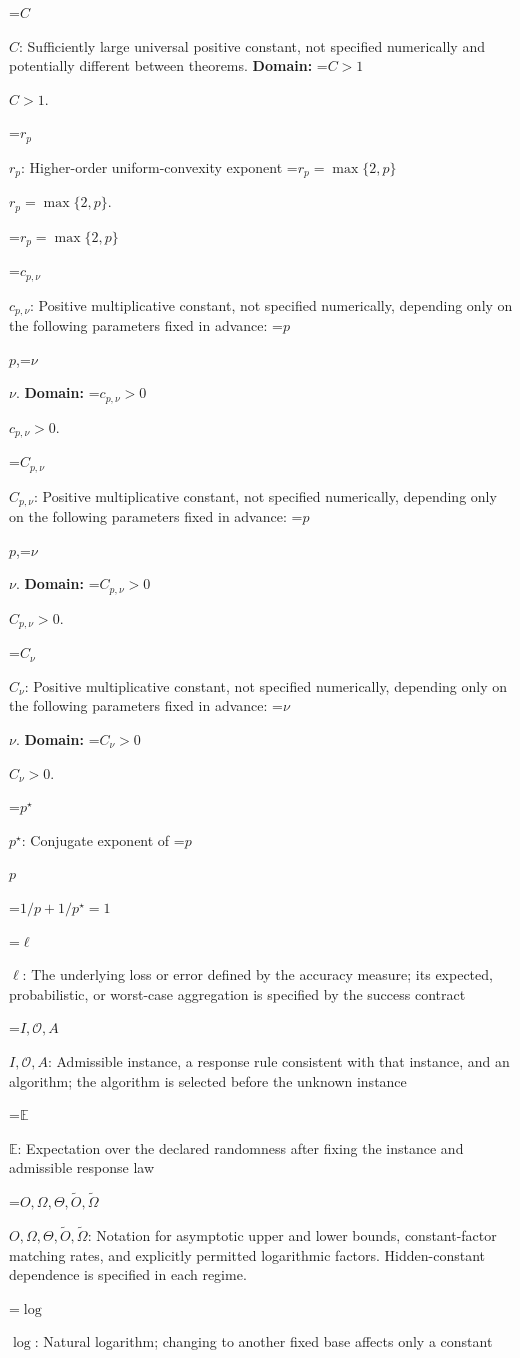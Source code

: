 \documentclass[10pt,a4paper]{article}
\newcommand{\AtlasMath}[1]{\par\begingroup\centering\setbox0=\hbox{$\displaystyle #1$}\ifdim\wd0>1.4\linewidth\typeout{ATLAS WIDE FORMULA: \the\wd0}\fi\ifdim\wd0>\linewidth\resizebox{\linewidth}{!}{\box0}\else\box0\fi\par\endgroup}
\newcommand{\AtlasInlineMath}[1]{\begingroup\setbox0=\hbox{$#1$}\ifdim\wd0>.4\linewidth\endgroup\AtlasMath{#1}\else\endgroup$#1$\fi}
\begin{document}
\AtlasInlineMath{C}: Sufficiently large universal positive constant, not specified numerically and potentially different between theorems. \textbf{Domain:} \AtlasInlineMath{C>1}.

\AtlasInlineMath{r_p}: Higher-order uniform-convexity exponent \AtlasInlineMath{r_p=\max\{2,p\}}.


\AtlasMath{r_p=\max\{2,p\}}


\AtlasInlineMath{c_{p,\nu}}: Positive multiplicative constant, not specified numerically, depending only on the following parameters fixed in advance: \AtlasInlineMath{p},\AtlasInlineMath{\nu}. \textbf{Domain:} \AtlasInlineMath{c_{p,\nu}>0}.

\AtlasInlineMath{C_{p,\nu}}: Positive multiplicative constant, not specified numerically, depending only on the following parameters fixed in advance: \AtlasInlineMath{p},\AtlasInlineMath{\nu}. \textbf{Domain:} \AtlasInlineMath{C_{p,\nu}>0}.

\AtlasInlineMath{C_{\nu}}: Positive multiplicative constant, not specified numerically, depending only on the following parameters fixed in advance: \AtlasInlineMath{\nu}. \textbf{Domain:} \AtlasInlineMath{C_{\nu}>0}.

\AtlasInlineMath{p^\star}: Conjugate exponent of \AtlasInlineMath{p}


\AtlasMath{1/p+1/p^\star=1}


\AtlasInlineMath{\ell}: The underlying loss or error defined by the accuracy measure; its expected, probabilistic, or worst-case aggregation is specified by the success contract

\AtlasInlineMath{I,\mathcal{O},A}: Admissible instance, a response rule consistent with that instance, and an algorithm; the algorithm is selected before the unknown instance

\AtlasInlineMath{\mathbb{E}}: Expectation over the declared randomness after fixing the instance and admissible response law

\AtlasInlineMath{O,\Omega,\Theta,\widetilde{O},\widetilde\Omega}: Notation for asymptotic upper and lower bounds, constant-factor matching rates, and explicitly permitted logarithmic factors. Hidden-constant dependence is specified in each regime.

\AtlasInlineMath{\log}: Natural logarithm; changing to another fixed base affects only a constant
\end{document}
